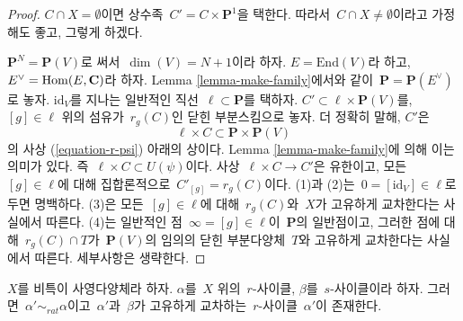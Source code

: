 \begin{proof}
$C \cap X = \emptyset$이면 상수족\ 
$C' = C \times \mathbf{P}^1$을 택한다. 따라서\ 
$C \cap X \not = \emptyset$이라고 가정해도 좋고, 그렇게 하겠다.

\medskip\noindent
$\mathbf{P}^N = \mathbf{P}(V)$로 써서\  $\dim(V) = N + 1$이라 하자.
$E = \text{End}(V)$라 하고, $E^\vee = \mathop{\mathrm{Hom}}\nolimits(E, \mathbf{C})$라 하자.
Lemma \ref{lemma-make-family}에서와 같이\ 
$\mathbf{P} = \mathbf{P}(E^\vee)$로 놓자.
$\text{id}_V$를 지나는 일반적인 직선\  $\ell \subset \mathbf{P}$를 택하자.
$C' \subset \ell \times \mathbf{P}(V)$를, $[g] \in \ell$ 위의 섬유가\ 
$r_g(C)$인 닫힌 부분스킴으로 놓자. 더 정확히 말해, $C'$은
$$
\ell \times C \subset \mathbf{P} \times \mathbf{P}(V)
$$
의 사상 (\ref{equation-r-psi}) 아래의 상이다. Lemma
\ref{lemma-make-family}에 의해 이는 의미가 있다. 즉\ 
$\ell \times C \subset U(\psi)$이다. 사상\ 
$\ell \times C \to C'$은 유한이고, 모든\  $[g] \in \ell$에 대해
집합론적으로\  $C'_{[g]} = r_g(C)$이다. (1)과 (2)는\ 
$0 = [\text{id}_V] \in \ell$로 두면 명백하다. (3)은 모든\ 
$[g] \in \ell$에 대해\  $r_g(C)$와\  $X$가 고유하게 교차한다는 사실에서
따른다. (4)는 일반적인 점\  $\infty = [g] \in \ell$이\ 
$\mathbf{P}$의 일반점이고, 그러한 점에 대해\ 
$r_g(C) \cap T$가\  $\mathbf{P}(V)$의 임의의 닫힌 부분다양체\  $T$와
고유하게 교차한다는 사실에서 따른다. 세부사항은 생략한다.
\end{proof}

\begin{lemma}
\label{lemma-moving-move}
$X$를 비특이 사영다양체라 하자. $\alpha$를\  $X$ 위의\  $r$-사이클,
$\beta$를\  $s$-사이클이라 하자. 그러면\ 
$\alpha' \sim_{rat} \alpha$이고\  $\alpha'$과\  $\beta$가 고유하게
교차하는\  $r$-사이클\  $\alpha'$이 존재한다.
\end{lemma}

